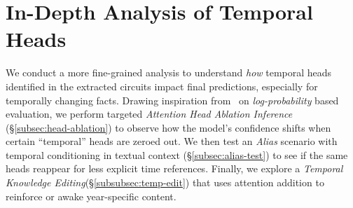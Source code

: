\section{In-Depth Analysis of Temporal Heads}
\label{sec:indepth-analysis}
We conduct a more fine-grained analysis to understand \emph{how} temporal heads identified in the extracted circuits impact final predictions, especially for temporally changing facts. 
Drawing inspiration from~\citealt{logprob} on \emph{log-probability} based evaluation, we perform targeted \emph{Attention Head Ablation Inference} (\S\ref{subsec:head-ablation}) to observe how the model’s confidence shifts when certain “temporal” heads are zeroed out. 
We then test an \emph{Alias} scenario with temporal conditioning in textual context (\S\ref{subsec:alias-test}) to see if the same heads reappear for less explicit time references. 
Finally, we explore a \emph{Temporal Knowledge Editing}(\S\ref{subsubsec:temp-edit}) that uses attention addition to reinforce or awake year-specific content.


